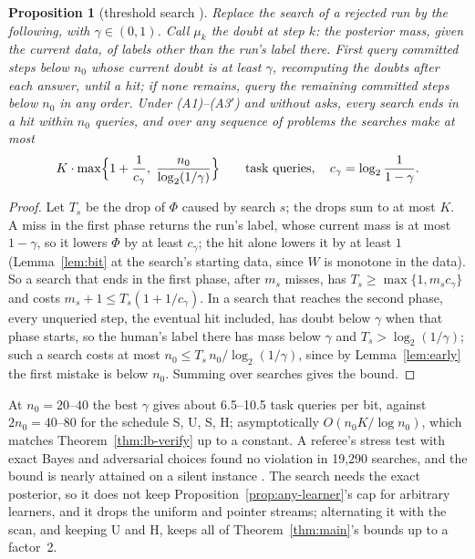 \documentclass[11pt]{article}
\newtheorem{proposition}[theorem]{Proposition}
\theoremstyle{definition}
\theoremstyle{remark}
\newcommand{\K}{K}
\begin{document}
\begin{proposition}[threshold search \cite{threadGB,referee11}]\label{prop:threshold}
Replace the search of a rejected run by the following, with $\gamma\in(0,1)$. Call $\mu_k$ the \emph{doubt} at step $k$: the posterior mass, given the current data, of labels other than the run's label there. First query committed steps below $n_0$ whose current doubt is at least $\gamma$, recomputing the doubts after each answer, until a hit; if none remains, query the remaining committed steps below $n_0$ in any order. Under (A1)--(A3$'$) and without asks, every search ends in a hit within $n_0$ queries, and over any sequence of problems the searches make at most
\[ \K\cdot\max\Bigl\{1+\frac1{c_\gamma},\;\frac{n_0}{\log_2(1/\gamma)}\Bigr\}\qquad\text{task queries},\quad c_\gamma=\log_2\frac1{1-\gamma}. \]
\end{proposition}
\begin{proof}
Let $T_s$ be the drop of $\Phi$ caused by search $s$; the drops sum to at most $\K$. A miss in the first phase returns the run's label, whose current mass is at most $1-\gamma$, so it lowers $\Phi$ by at least $c_\gamma$; the hit alone lowers it by at least $1$ (Lemma~\ref{lem:bit} at the search's starting data, since $W$ is monotone in the data). So a search that ends in the first phase, after $m_s$ misses, has $T_s\ge\max\{1,m_sc_\gamma\}$ and costs $m_s+1\le T_s(1+1/c_\gamma)$. In a search that reaches the second phase, every unqueried step, the eventual hit included, has doubt below $\gamma$ when that phase starts, so the human's label there has mass below $\gamma$ and $T_s>\log_2(1/\gamma)$; such a search costs at most $n_0\le T_s\,n_0/\log_2(1/\gamma)$, since by Lemma~\ref{lem:early} the first mistake is below $n_0$. Summing over searches gives the bound.
\end{proof}

At $n_0=20$--$40$ the best $\gamma$ gives about 6.5--10.5 task queries per bit, against $2n_0=40$--$80$ for the schedule S, U, S, H; asymptotically $O(n_0\K/\log n_0)$, which matches Theorem~\ref{thm:lb-verify} up to a constant. A referee's stress test with exact Bayes and adversarial choices found no violation in 19{,}290 searches, and the bound is nearly attained on a silent instance \cite{referee11}. The search needs the exact posterior, so it does not keep Proposition~\ref{prop:any-learner}'s cap for arbitrary learners, and it drops the uniform and pointer streams; alternating it with the scan, and keeping U and H, keeps all of Theorem~\ref{thm:main}'s bounds up to a factor~2.
\end{document}
